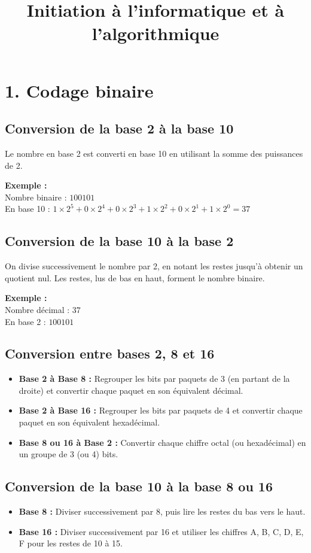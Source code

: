 \documentclass{article}
\title{Initiation à l'informatique et à l'algorithmique}
\author{}
\date{}
\begin{document}
\maketitle

\section*{1. Codage binaire}

\subsection*{Conversion de la base 2 à la base 10}
Le nombre en base 2 est converti en base 10 en utilisant la somme des puissances de 2.

\textbf{Exemple :} \\
Nombre binaire : \( 100101 \) \\
En base 10 : \( 1 \times 2^5 + 0 \times 2^4 + 0 \times 2^3 + 1 \times 2^2 + 0 \times 2^1 + 1 \times 2^0 = 37 \)

\subsection*{Conversion de la base 10 à la base 2}
On divise successivement le nombre par 2, en notant les restes jusqu'à obtenir un quotient nul. Les restes, lus de bas en haut, forment le nombre binaire.

\textbf{Exemple :} \\
Nombre décimal : \( 37 \) \\
En base 2 : \( 100101 \)

\subsection*{Conversion entre bases 2, 8 et 16}
\begin{itemize}
    \item \textbf{Base 2 à Base 8 :} Regrouper les bits par paquets de 3 (en partant de la droite) et convertir chaque paquet en son équivalent décimal.
    \item \textbf{Base 2 à Base 16 :} Regrouper les bits par paquets de 4 et convertir chaque paquet en son équivalent hexadécimal.
    \item \textbf{Base 8 ou 16 à Base 2 :} Convertir chaque chiffre octal (ou hexadécimal) en un groupe de 3 (ou 4) bits.
\end{itemize}

\subsection*{Conversion de la base 10 à la base 8 ou 16}
\begin{itemize}
    \item \textbf{Base 8 :} Diviser successivement par 8, puis lire les restes du bas vers le haut.
    \item \textbf{Base 16 :} Diviser successivement par 16 et utiliser les chiffres A, B, C, D, E, F pour les restes de 10 à 15.
\end{itemize}
\end{document}
